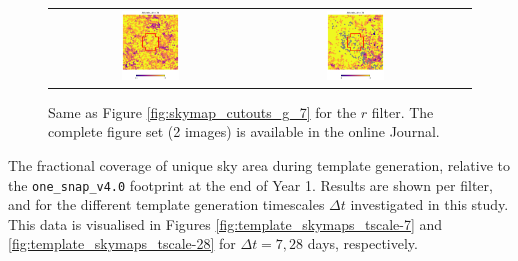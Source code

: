 \documentclass[preprintm,linenumbers]{aastex631}
\newcommand{\baseline}{\texttt{one\_snap\_v4.0}\xspace}
\begin{document}
\begin{figure}
\begin{tabular}{  c c c}
				\includegraphics[width=0.3\textwidth]{results/skymaps_cutout/skymaps_cutout_delta_first_year_one_snap_v4_0_10yrs_db_noDD_noTwi_tscale-7_nside-256_doAllTemplateMetrics_reduceCount_r_WFD_noDD_noTwi.pdf} &
				\includegraphics[width=0.3\textwidth]{results/skymaps_cutout/skymaps_cutout_delta_first_year_one_snap_v4_0_10yrs_db_noDD_noTwi_tscale-7_nside-256_doAllTemplateMetrics_reduceCount_r_GP_noDD_noTwi.pdf} \\
			\end{tabular}
			\caption{
				 Same as Figure \ref{fig:skymap_cutouts_g_7} for the $r$ filter.  
               The complete figure set (2 images) is available in the online Journal. 
			}
   \label{fig:skymap_cutouts_r_7}
		\end{figure}

		\begin{table}
			\centering
			
			\caption{
   The fractional coverage of unique sky area during template generation, relative to the \baseline footprint at the end of Year 1.
   Results are shown per filter, and for the different template generation timescales $\Delta t$ investigated in this study.
   This data is visualised in Figures \ref{fig:template_skymaps_tscale-7} and  \ref{fig:template_skymaps_tscale-28} for $\Delta t = 7, 28$ days, respectively.
			}
			\label{tab:year1_unique_coverage_templates}
		\end{table}
  
\end{document}
